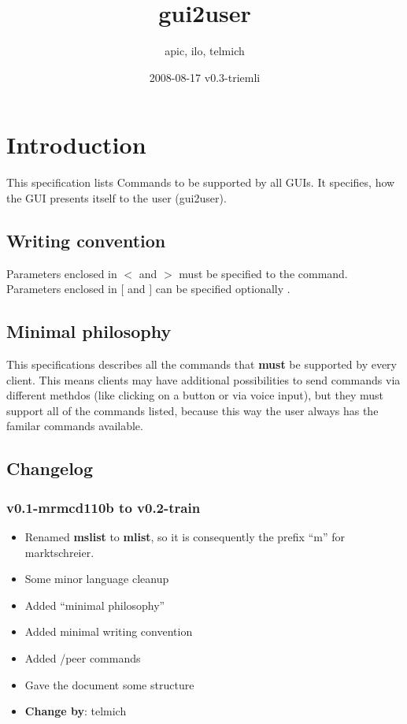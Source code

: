 \documentclass[12pt,a4paper]{article}
\begin{document}
\title{gui2user}
\date{2008-08-17 v0.3-triemli}
\author{apic, ilo, telmich}

\maketitle

\section{Introduction}
This specification lists Commands to be supported by all GUIs. It
specifies, how the GUI presents itself to the user (gui2user).

\subsection{Writing convention}
Parameters enclosed in $<$ and $>$ must be specified to the command.
Parameters enclosed in $[$ and $]$ can be specified optionally .

\subsection{Minimal philosophy}
This specifications describes all the commands that \textbf{must} be
supported by every client. This means clients may have additional possibilities
to send commands via different methdos (like clicking on a button or via
voice input), but they must support all of the commands listed, because this
way the user always has the familar commands available.

\subsection{Changelog}
\subsubsection{v0.1-mrmcd110b to v0.2-train}
   \begin{itemize}
      \item Renamed \textbf{mslist} to \textbf{mlist}, so it is consequently the prefix
      "`m"' for marktschreier.
      \item Some minor language cleanup 
      \item Added "`minimal philosophy"'
      \item Added minimal writing convention
      \item Added /peer commands
      \item Gave the document some structure
      \item \textbf{Change by}: telmich
   \end{itemize}
\end{document}
